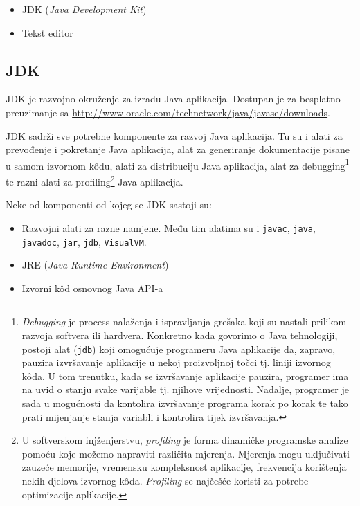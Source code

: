 \begin{itemize}
    \item JDK (\emph{Java Development Kit})
    \item Tekst editor
\end{itemize}

\subsection{JDK}
JDK je razvojno okruženje za izradu Java aplikacija. Dostupan je za besplatno preuzimanje sa \url{http://www.oracle.com/technetwork/java/javase/downloads}.

\begin{infobox}
    JDK sadrži sve potrebne komponente za razvoj Java aplikacija. Tu su i alati za prevođenje i pokretanje Java aplikacija, alat za generiranje dokumentacije pisane u samom izvornom kôdu, alati za distribuciju Java aplikacija, alat za debugging\footnote{\emph{Debugging} je process nalaženja i ispravljanja grešaka koji su nastali prilikom razvoja softvera ili hardvera. Konkretno kada govorimo o Java tehnologiji, postoji alat (\texttt{jdb}) koji omogućuje programeru Java aplikacije da, zapravo, pauzira izvršavanje aplikacije u nekoj proizvoljnoj točci tj. liniji izvornog kôda. U tom trenutku, kada se izvršavanje aplikacije pauzira, programer ima na uvid o stanju svake varijable tj. njihove vrijednosti. Nadalje, programer je sada u mogućnosti da kontolira izvršavanje programa korak po korak te tako prati mijenjanje stanja variabli i kontrolira tijek izvršavanja.} te razni alati za profiling\footnote{U softverskom injženjerstvu, \emph{profiling} je forma dinamičke programske analize pomoću koje možemo napraviti različita mjerenja. Mjerenja mogu uključivati zauzeće memorije, vremensku kompleksnost aplikacije, frekvencija korištenja nekih djelova izvornog kôda. \emph{Profiling} se najčešće koristi za potrebe optimizacije aplikacije.} Java aplikacija.
\end{infobox}

Neke od komponenti od kojeg se JDK sastoji su:

\begin{itemize}
    \item Razvojni alati za razne namjene. Među tim alatima su i \texttt{javac}, \texttt{java}, \texttt{javadoc}, \texttt{jar}, \texttt{jdb}, \texttt{VisualVM}.
    \item JRE (\emph{Java Runtime Environment})
    \item Izvorni kôd osnovnog Java API-a
\end{itemize}

